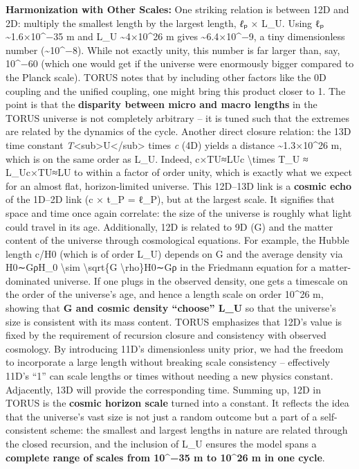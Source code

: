\documentclass[]{article}
\begin{document}
\textbf{Harmonization with Other Scales:} One striking relation is
between 12D and 2D: multiply the smallest length by the largest length,
\emph{ℓ}ₚ × L\_U. Using ℓₚ \textasciitilde{}1.6×10\^{}−35 m and L\_U
\textasciitilde{}4×10\^{}26 m gives \textasciitilde{}6.4×10\^{}−9, a
tiny dimensionless number (\textasciitilde{}10\^{}−8)​. While not
exactly unity, this number is far larger than, say, 10\^{}−60 (which one
would get if the universe were enormously bigger compared to the Planck
scale). TORUS notes that by including other factors like the 0D coupling
and the unified coupling, one might bring this product closer to 1​. The
point is that the \textbf{disparity between micro and macro lengths} in
the TORUS universe is not completely arbitrary -- it is tuned such that
the extremes are related by the dynamics of the cycle​. Another direct
closure relation: the 13D time constant
\emph{T}\textless{}sub\textgreater{}U\textless{}/sub\textgreater{} times
\emph{c} (4D) yields a distance \textasciitilde{}1.3×10\^{}26 m, which
is on the same order as L\_U​. Indeed, c×TU≈LUc \textbackslash{}times
T\_U ≈ L\_Uc×TU​≈LU​ to within a factor of order unity, which is exactly
what we expect for an almost flat, horizon-limited universe. This
12D--13D link is a \textbf{cosmic echo} of the 1D--2D link (c × t\_P =
ℓ\_P), but at the largest scale​. It signifies that space and time once
again correlate: the size of the universe is roughly what light could
travel in its age. Additionally, 12D is related to 9D (G) and the matter
content of the universe through cosmological equations. For example, the
Hubble length c/H0 (which is of order L\_U) depends on G and the average
density via H0∼GρH\_0 \textbackslash{}sim \textbackslash{}sqrt\{G
\textbackslash{}rho\}H0​∼Gρ​ in the Friedmann equation for a
matter-dominated universe​. If one plugs in the observed density, one
gets a timescale on the order of the universe's age, and hence a length
scale on order 10\^{}26 m, showing that \textbf{G and cosmic density
``choose'' L\_U} so that the universe's size is consistent with its mass
content. TORUS emphasizes that 12D's value is fixed by the requirement
of recursion closure and consistency with observed cosmology​. By
introducing 11D's dimensionless unity prior, we had the freedom to
incorporate a large length without breaking scale consistency --
effectively 11D's ``1'' can scale lengths or times without needing a new
physics constant​. Adjacently, 13D will provide the corresponding time.
Summing up, 12D in TORUS is the \textbf{cosmic horizon scale} turned
into a constant. It reflects the idea that the universe's vast size is
not just a random outcome but a part of a self-consistent scheme: the
smallest and largest lengths in nature are related through the closed
recursion, and the inclusion of L\_U ensures the model spans a
\textbf{complete range of scales from 10\^{}−35 m to 10\^{}26 m in one
cycle}.
\end{document}
